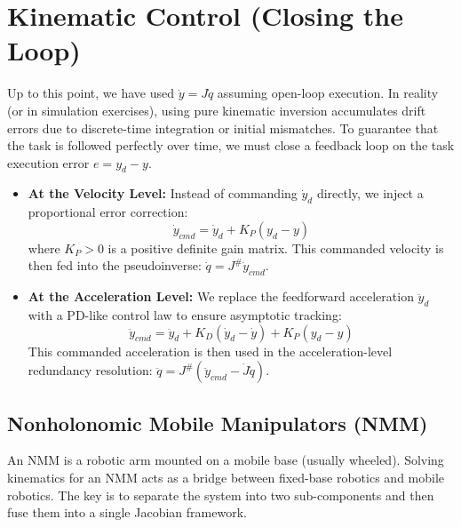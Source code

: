 \documentclass[11pt,a4paper]{article}
\begin{document}
\section{Kinematic Control (Closing the Loop)}
Up to this point, we have used $\dot{y} = J\dot{q}$ assuming open-loop execution. In reality (or in simulation exercises), using pure kinematic inversion accumulates drift errors due to discrete-time integration or initial mismatches. 
To guarantee that the task is followed perfectly over time, we must close a feedback loop on the task execution error $e = y_d - y$.

\begin{itemize}
    \item \textbf{At the Velocity Level:} Instead of commanding $\dot{y}_d$ directly, we inject a proportional error correction:
    \begin{equation}
        \dot{y}_{cmd} = \dot{y}_d + K_P (y_d - y)
    \end{equation}
    where $K_P > 0$ is a positive definite gain matrix. This commanded velocity is then fed into the pseudoinverse: $\dot{q} = J^\# \dot{y}_{cmd}$.
    
    \item \textbf{At the Acceleration Level:} We replace the feedforward acceleration $\ddot{y}_d$ with a PD-like control law to ensure asymptotic tracking:
    \begin{equation}
        \ddot{y}_{cmd} = \ddot{y}_d + K_D (\dot{y}_d - \dot{y}) + K_P (y_d - y)
    \end{equation}
    This commanded acceleration is then used in the acceleration-level redundancy resolution: $\ddot{q} = J^\# (\ddot{y}_{cmd} - \dot{J}\dot{q})$.
\end{itemize}

\subsection{Nonholonomic Mobile Manipulators (NMM)}
An NMM is a robotic arm mounted on a mobile base (usually wheeled). Solving kinematics for an NMM acts as a bridge between fixed-base robotics and mobile robotics. The key is to separate the system into two sub-components and then fuse them into a single Jacobian framework.
\end{document}

